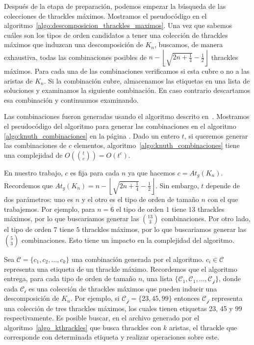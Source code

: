   Después de la etapa de preparación, podemos empezar la búsqueda de las colecciones de
  thrackles máximos. Mostramos el pseudocódigo en el
  algoritmo~\ref{algo:descomposicion_thrackles_maximos}. Una vez que sabemos cuáles son
  los tipos de orden candidatos a tener una colección de thrackles máximos que induzcan
  una descomposición de $K_n$, buscamos, de manera exhaustiva, todas las combinaciones
  posibles de $n -  \left\lfloor\sqrt{2n + \frac{1}{4}} - \frac{1}{2}\right\rfloor$
  thrackles máximos. Para cada una de las combinaciones verificamos si esta cubre o no a
  las aristas de $K_n$. Si la combinación cubre, almacenamos las etiquetas en una lista
  de soluciones y examinamos la siguiente combinación. En caso contrario descartamos esa
  combinación y continuamos examinando.

  Las combinaciones fueron generadas usando el algoritmo descrito en~\cite{Knuth2011A}.
  Mostramos el pseudocódigo del algoritmo para generar las combinaciones en el algoritmo
  \ref{algo:knuth_combinaciones} en la página \pageref{algo:knuth_combinaciones}. Dado un
  entero $t$, si queremos generar las combinaciones de $c$ elementos,
  algoritmo~\ref{algo:knuth_combinaciones} tiene una complejidad de
  $O\left(\binom{t}{c}\right) = O(t^c)$.

  En nuestro trabajo, $c$ es fija para cada $n$ ya que hacemos $c = At_g(K_n)$.
  Recordemos que $At_g(K_n) = n - \left\lfloor\sqrt{2n+\frac{1}{4}} -
  \frac{1}{2}\right\rfloor$. Sin embargo, $t$ depende de dos parámetros: uno es $n$ y el
  otro es el tipo de orden de tamaño $n$ con el que trabajemos. Por ejemplo, para $n=6$
  el tipo de orden $1$ tiene $13$ thrackles máximos, por lo que buscariamos generar las
  $\binom{13}{3}$ combinaciones. Por otro lado, el tipo de orden $7$ tiene $5$ thrackles
  máximos, por lo que buscariamos generar las $\binom{5}{3}$ combinaciones. Esto tiene un
  impacto en la complejidad del algoritmo.

  Sea $\mathcal{C}=\{c_1,c_2,\dots,c_k\}$ una combinación generada por el algoritmo.
  $c_i\in\mathcal{C}$ representa una etiqueta de un thrackle máximo. Recordemos que el
  algoritmo entrega, para cada tipo de orden de tamaño $n$, una lista
  $\{\mathcal{C_1},\mathcal{C_1},\dots,\mathcal{C_j}\}$, donde cada $\mathcal{C_i}$ es
  una colección de thrackles máximos que pueden inducir una descomposición de $K_n$. Por
  ejemplo, si $\mathcal{C_j}=\{23,45,99\}$ entonces $\mathcal{C_j}$ representa una
  colección de tres thrackles máximos, los cuales tienen etiquetas 23, 45 y 99
  respectivamente. Es posible buscar, en el archivo generado por el
  algoritmo~\ref{algo_kthrackles} que busca thrackles con $k$ aristas, el thrackle que
  corresponde con determinada etiqueta y realizar operaciones sobre este.

